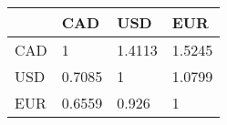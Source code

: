 \begin{tabular}{llll}
& CAD & USD & EUR \\ 
\hline 
CAD & 1 & 1.4113 & 1.5245 \\ 
USD & 0.7085 & 1 & 1.0799 \\ 
EUR & 0.6559 & 0.926 & 1 \\ 
\hline 
\end{tabular}